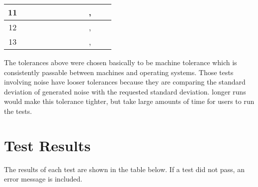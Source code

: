 \begin{table}[H]
\begin{tabular}{ c | c | c | c | c | c | c | c | c | c | c | c }
		11	& &&&&&&&&,&&	   \\ \hline
		12	& &&&&&&&&,&&	   \\ \hline
		13    & &&&&&&&&,&&	   \\ \hline
		\hline
	\end{tabular}
\end{table}
The tolerances above were chosen basically to be machine tolerance which is consistently passable between machines and operating systems. Those tests involving noise have looser tolerances because they are comparing the standard deviation of generated noise with the requested standard deviation. longer runs would make this tolerance tighter, but take large amounts of time for users to run the tests.

\section{Test Results}
The results of each test are shown in the table below. If a test did not pass, an error message is included.

